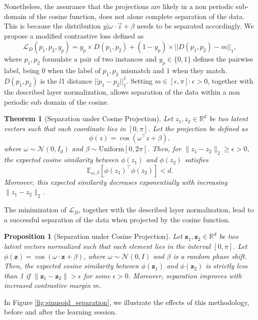 \documentclass{article}
\newtheorem{proposition}{Proposition}
\newtheorem{theorem}{Theorem}
\begin{document}
Nonetheless, the assurance that the projections are likely in a non periodic sub-domain of the cosine function, does not alone complete separation of the data. This is because the distribution $y|\omega \cdot \vec{z} +\beta$ needs to be separated accordingly. We propose a modified contrastive loss defined as
\begin{equation}\label{equation:contrastive}
    \mathcal{L}_D(p_1, p_2, y_p) = y_p \times D(p_1, p_2) + (1-y_p) \times ||D(p_1,p_2)-m||_1,
\end{equation}
where $p_1, p_2$ formulate a pair of two instances and $y_p \in \{0,1\}$ defines the pairwise label, being $0$ when the label of $p_1, p_2$ mismatch and $1$ when they match. $D(p_1,p_2)$ is the $l$1 distance $||p_1-p_2||_1^1$. Setting $m\in[\epsilon, \pi]: \epsilon>0$, together with the described layer normalization, allows separation of the data within a non  periodic sub domain of the cosine. 
\begin{theorem}[Separation under Cosine Projection]
Let $z_1, z_2 \in \mathbb{R}^d$ be two latent vectors such that each coordinate lies in $[0, \pi]$. Let the projection be defined as
\[
\phi(z) = \cos(\omega^\top z + \beta),
\]
where $\omega \sim \mathcal{N}(0, I_d)$ and $\beta \sim \mathrm{Uniform}[0, 2\pi]$. Then, for $\|z_1 - z_2\|_2 \geq \epsilon > 0$, the expected cosine similarity between $\phi(z_1)$ and $\phi(z_2)$ satisfies
\[
\mathbb{E}_{\omega, \beta}[\phi(z_1)^\top \phi(z_2)] < d.
\]
Moreover, this expected similarity decreases exponentially with increasing $\|z_1 - z_2\|_2$.
\end{theorem}
The minimization of $\mathcal{L}_D$, together with the described layer normalization, lead to a successful separation of the data when projected by the cosine function. 
\begin{proposition}[Separation under Cosine Projection]
Let $\mathbf{z}_1, \mathbf{z}_2 \in \mathbb{R}^d$ be two latent vectors normalized such that each element lies in the interval $[0, \pi]$. Let $\phi(\mathbf{z}) = \cos(\omega \cdot \mathbf{z} + \beta)$, where $\omega \sim \mathcal{N}(0, I)$ and $\beta$ is a random phase shift. Then, the expected cosine similarity between $\phi(\mathbf{z}_1)$ and $\phi(\mathbf{z}_2)$ is strictly less than 1 if $\|\mathbf{z}_1 - \mathbf{z}_2\| > \epsilon$ for some $\epsilon > 0$. Moreover, separation improves with increased contrastive margin $m$.
\end{proposition}
In Figure \ref{fig:sinusoid_separation}, we illustrate the effects of this methodology, before and after the learning session.
\end{document}
